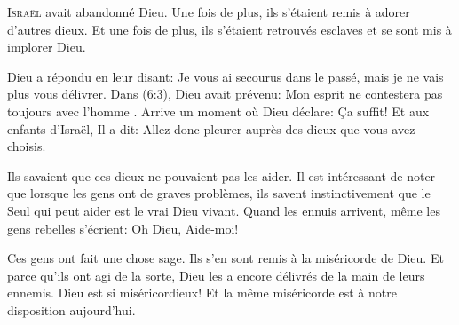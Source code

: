 \dvrule







\lettrine{I}{sraël} avait abandonné Dieu.
 Une fois de plus, ils s'étaient remis à adorer d'autres dieux.
 Et une fois de plus, ils s'étaient retrouvés esclaves
 et se sont mis à implorer Dieu.

Dieu a répondu en leur disant:
 \Og Je vous ai secourus dans le passé,
 mais je ne vais plus vous délivrer. \Fg{}
 Dans (6:3), Dieu avait prévenu:
 \Og Mon esprit ne contestera pas toujours avec l'homme \Fg{}.
 Arrive un moment où Dieu déclare: \Og Ça suffit! \Fg{}
 Et aux enfants d'Israël, Il a dit:
 \Og Allez donc pleurer auprès des dieux que vous avez choisis. \Fg{}

Ils savaient que ces dieux ne pouvaient pas les aider.
 Il est intéressant de noter que lorsque les gens ont de graves problèmes,
 ils savent instinctivement que le Seul qui peut aider est le vrai Dieu vivant.
 Quand les ennuis arrivent, même les gens rebelles s'écrient:
 \Og Oh Dieu, Aide-moi! \Fg{}


Ces gens ont fait une chose sage. Ils s'en sont remis à la miséricorde de Dieu.
 Et parce qu'ils ont agi de la sorte, Dieu les a encore délivrés
 de la main de leurs ennemis. Dieu est si miséricordieux!
 Et la même miséricorde est à notre disposition aujourd'hui.

